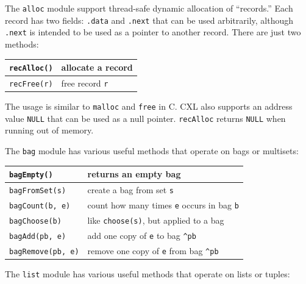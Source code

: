 \documentclass{report}
\begin{document}
The \texttt{alloc} module
support thread-safe dynamic allocation of ``records.''
Each record has two fields: \texttt{.data} and \texttt{.next} that
can be used arbitrarily, although \texttt{.next} is intended to be
used as a pointer to another record.
There are just two methods:

\vspace{1em}
\begin{tabular}{|l|l|}
\hline
\texttt{recAlloc()} & allocate a record \\
\hline
\texttt{recFree(r)} & free record \texttt{r} \\
\hline
\end{tabular}
\vspace{1em}

The usage is similar to \texttt{malloc} and \texttt{free} in C.
CXL also supports an address value \texttt{NULL} that can be
used as a null pointer.  \texttt{recAlloc} returns \texttt{NULL}
when running out of memory.

The \texttt{bag} module
has various useful methods that operate on bags or
multisets:

\vspace{1em}
\begin{tabular}{|l|l|}
\hline
\texttt{bagEmpty()} & returns an empty bag\\
\hline
\texttt{bagFromSet(s)} & create a bag from set \texttt{s}\\
\hline
\texttt{bagCount(b, e)} & count how many times \texttt{e} occurs in bag \texttt{b}\\
\hline
\texttt{bagChoose(b)} & like \texttt{choose(s)}, but applied to a bag\\
\hline
\texttt{bagAdd(pb, e)} & add one copy of \texttt{e} to bag \texttt{\^{}pb}\\
\hline
\texttt{bagRemove(pb, e)} & remove one copy of \texttt{e} from bag \texttt{\^{}pb}\\
\hline
\end{tabular}
\vspace{1em}

\noindent
{}
The \texttt{list} module has various useful methods that operate on lists
or tuples:
\end{document}
